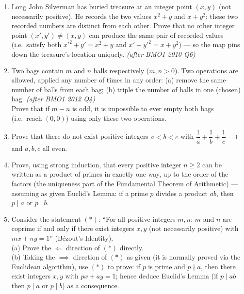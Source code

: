 \documentclass[11pt,a4paper]{article}
\begin{document}
\begin{enumerate}

\item Long John Silverman has buried treasure at an integer point $(x,y)$ (not necessarily positive). He records the two values $x^2+y$ and $x+y^2$; these two recorded numbers are distinct from each other. Prove that no other integer point $(x',y')\neq(x,y)$ can produce the same pair of recorded values (i.e.\ satisfy both $x'^2+y'=x^2+y$ and $x'+y'^2=x+y^2$) --- so the map pins down the treasure's location uniquely. \textit{\small(after BMO1 2010 Q6)}

\item Two bags contain $m$ and $n$ balls respectively ($m,n>0$). Two operations are allowed, applied any number of times in any order: (a) remove the same number of balls from each bag; (b) triple the number of balls in one (chosen) bag. \textit{\small(after BMO1 2012 Q4)}\\
Prove that if $m-n$ is odd, it is impossible to ever empty both bags (i.e.\ reach $(0,0)$) using only these two operations.

\item Prove that there do not exist positive integers $a<b<c$ with $\dfrac1a+\dfrac1b+\dfrac1c=1$ and $a,b,c$ all even.

\item Prove, using strong induction, that every positive integer $n\geq2$ can be written as a product of primes in exactly one way, up to the order of the factors (the uniqueness part of the Fundamental Theorem of Arithmetic) --- assuming as given Euclid's Lemma: if a prime $p$ divides a product $ab$, then $p\mid a$ or $p\mid b$.

\item Consider the statement $(*)$: ``For all positive integers $m,n$: $m$ and $n$ are coprime if and only if there exist integers $x,y$ (not necessarily positive) with $mx+ny=1$'' (Bézout's Identity).\\
(a) Prove the $\Longleftarrow$ direction of $(*)$ directly.\\
(b) Taking the $\implies$ direction of $(*)$ as given (it is normally proved via the Euclidean algorithm), use $(*)$ to prove: if $p$ is prime and $p\nmid a$, then there exist integers $x,y$ with $px+ay=1$; hence deduce Euclid's Lemma (if $p\mid ab$ then $p\mid a$ or $p\mid b$) as a consequence.

\end{enumerate}

\end{document}
